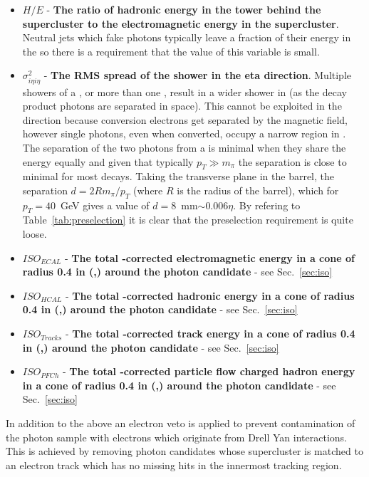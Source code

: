 \begin{itemize}
  \item $H/E$ - \textbf{The ratio of hadronic energy in the \HCAL tower behind the supercluster to the electromagnetic energy in the supercluster}. Neutral jets which fake photons typically leave a fraction of their energy in the \HCAL so there is a requirement that the value of this variable is small.
  \item $\sigma^{2}_{i\eta i\eta}$ - \textbf{The RMS spread of the shower in the eta direction}. Multiple showers of a \pizero, or more than one \pizero, result in a wider shower in \eta (as the \pizero decay product photons are separated in space). This cannot be exploited in the \phi direction because conversion electrons get separated by the magnetic field, however single photons, even when converted, occupy a narrow region in \eta. The separation of the two photons from a \pizero is minimal when they share the energy equally and given that typically $p_{T}\gg m_{\pi}$ the separation is close to minimal for most \pizero decays. Taking the transverse plane in the barrel, the separation $d=2Rm_{\pi}/p_{T}$ (where $R$ is the radius of the barrel), which for $p_{T}=40$~GeV gives a value of $d=$8~mm$\sim0.006\eta$. By refering to Table~\ref{tab:preselection} it is clear that the preselection requirement is quite loose.
  \item $ISO_{ECAL}$ - \textbf{The total \rho-corrected electromagnetic energy in a cone of radius 0.4 in (\eta,\phi) around the photon candidate} - see Sec.~\ref{sec:iso}
  \item $ISO_{HCAL}$ - \textbf{The total \rho-corrected hadronic energy in a cone of radius 0.4 in (\eta,\phi) around the photon candidate} - see Sec.~\ref{sec:iso}
  \item $ISO_{Tracks}$ - \textbf{The total \rho-corrected track energy in a cone of radius 0.4 in (\eta,\phi) around the photon candidate} - see Sec.~\ref{sec:iso}
  \item $ISO_{PFCh}$ - \textbf{The total \rho-corrected particle flow charged hadron energy in a cone of radius 0.4 in (\eta,\phi) around the photon candidate} - see Sec.~\ref{sec:iso}
\end{itemize}

In addition to the above an electron veto is applied to prevent contamination of the photon sample with electrons which originate from Drell Yan interactions. This is achieved by removing photon candidates whose supercluster is matched to an electron track which has no missing hits in the innermost tracking region.

